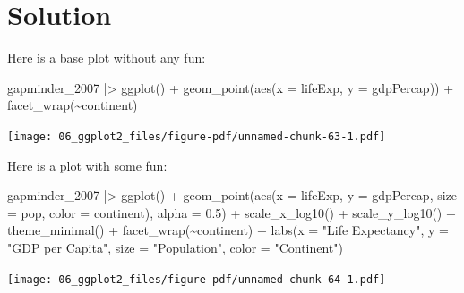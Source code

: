 \documentclass[
  letterpaper,
  DIV=11,
  numbers=noendperiod]{scrreprt}
\newenvironment{Shaded}{\begin{snugshade}}{\end{snugshade}}
\newcommand{\AttributeTok}[1]{\textcolor[rgb]{0.40,0.45,0.13}{#1}}
\newcommand{\FloatTok}[1]{\textcolor[rgb]{0.68,0.00,0.00}{#1}}
\newcommand{\FunctionTok}[1]{\textcolor[rgb]{0.28,0.35,0.67}{#1}}
\newcommand{\NormalTok}[1]{\textcolor[rgb]{0.00,0.23,0.31}{#1}}
\newcommand{\SpecialCharTok}[1]{\textcolor[rgb]{0.37,0.37,0.37}{#1}}
\newcommand{\StringTok}[1]{\textcolor[rgb]{0.13,0.47,0.30}{#1}}
\begin{document}
\section{Solution}

Here is a base plot without any fun:

\begin{Shaded}
\begin{Highlighting}[]
\NormalTok{gapminder\_2007 }\SpecialCharTok{|\textgreater{}}
  \FunctionTok{ggplot}\NormalTok{() }\SpecialCharTok{+}
  \FunctionTok{geom\_point}\NormalTok{(}\FunctionTok{aes}\NormalTok{(}\AttributeTok{x =}\NormalTok{ lifeExp, }\AttributeTok{y =}\NormalTok{ gdpPercap)) }\SpecialCharTok{+}
  \FunctionTok{facet\_wrap}\NormalTok{(}\SpecialCharTok{\textasciitilde{}}\NormalTok{continent)}
\end{Highlighting}
\end{Shaded}

\texttt{[image: 06\_ggplot2\_files/figure-pdf/unnamed-chunk-63-1.pdf]}

Here is a plot with some fun:

\begin{Shaded}
\begin{Highlighting}[]
\NormalTok{gapminder\_2007 }\SpecialCharTok{|\textgreater{}}
  \FunctionTok{ggplot}\NormalTok{() }\SpecialCharTok{+}
  \FunctionTok{geom\_point}\NormalTok{(}\FunctionTok{aes}\NormalTok{(}\AttributeTok{x =}\NormalTok{ lifeExp, }
                 \AttributeTok{y =}\NormalTok{ gdpPercap,}
                 \AttributeTok{size =}\NormalTok{ pop,}
                 \AttributeTok{color =}\NormalTok{ continent),}
             \AttributeTok{alpha =} \FloatTok{0.5}\NormalTok{) }\SpecialCharTok{+}
  \FunctionTok{scale\_x\_log10}\NormalTok{() }\SpecialCharTok{+}
  \FunctionTok{scale\_y\_log10}\NormalTok{() }\SpecialCharTok{+}
  \FunctionTok{theme\_minimal}\NormalTok{() }\SpecialCharTok{+}
  \FunctionTok{facet\_wrap}\NormalTok{(}\SpecialCharTok{\textasciitilde{}}\NormalTok{continent) }\SpecialCharTok{+}
  \FunctionTok{labs}\NormalTok{(}\AttributeTok{x =} \StringTok{"Life Expectancy"}\NormalTok{,}
       \AttributeTok{y =} \StringTok{"GDP per Capita"}\NormalTok{,}
       \AttributeTok{size =} \StringTok{"Population"}\NormalTok{,}
       \AttributeTok{color =} \StringTok{"Continent"}\NormalTok{) }
\end{Highlighting}
\end{Shaded}

\texttt{[image: 06\_ggplot2\_files/figure-pdf/unnamed-chunk-64-1.pdf]}
\end{document}
